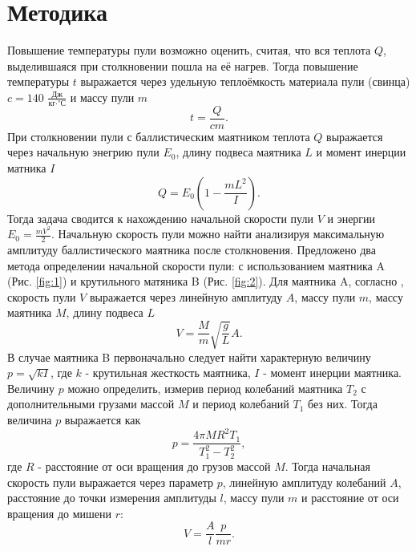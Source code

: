 \documentclass[12pt]{article}
\begin{document}
\section{Методика}
Повышение температуры пули возможно оценить, считая, что вся теплота $Q$, выделившаяся при столкновении пошла на её нагрев. Тогда повышение 
температуры $t$ выражается через удельную теплоёмкость материала пули (свинца) $c = 140$ $\frac{\textrm{Дж}}{\textrm{кг}\cdot\textrm{°С}}$ 
и массу пули $m$
\begin{equation}\label{eq:1}
    t = \frac{Q}{cm}.
\end{equation}
При столкновении пули с баллистическим маятником теплота $Q$ выражается через начальную энегрию пули $E_0$, длину подвеса маятника $L$ и 
момент инерции матника $I$
\begin{equation}\label{eq:2}
    Q = E_0\left(1 - \frac{mL^2}{I}\right).
\end{equation}
Тогда задача сводится к нахождению начальной скорости пули $V$ и энергии $E_0 = \frac{mV^2}{2}$.
Начальную скорость пули можно найти анализируя максимальную амплитуду баллистического маятника после столкновения. Предложено два метода определении
начальной скорости пули: с использованием маятника A (Рис. \ref{fig:1}) и крутильного матяника B (Рис. \ref{fig:2}). Для маятника A, 
согласно \cite{LabBook}, скорость пули $V$ выражается через линейную амплитуду $A$, массу пули $m$, массу маятника $M$, длину подвеса $L$
\begin{equation}\label{eq:3}
    V = \frac{M}{m}\sqrt{\frac{g}{L}}A.
\end{equation}
В случае маятника B первоначально следует найти характерную величину $p = \sqrt{kI}$, где $k$ - крутильная жесткость маятника, $I$ - момент 
инерции маятника. Величину $p$ можно определить, измерив период колебаний маятника $T_2$ с дополнительными грузами массой $M$ и период колебаний
$T_1$ без них. Тогда величина $p$ выражается как
\begin{equation}\label{eq:4}
    p = \frac{4 \pi MR^2 T_1}{T_1^2 - T_2^2},
\end{equation}
где $R$ - расстояние от оси вращения до грузов массой $M$. Тогда начальная скорость пули выражается через параметр $p$, линейную амплитуду 
колебаний $A$, расстояние до точки измерения амплитуды $l$, массу пули $m$ и расстояние от оси вращения до мишени $r$:
\begin{equation}\label{eq:5}
    V = \frac{A}{l} \frac{p}{mr}.
\end{equation}
\end{document}
